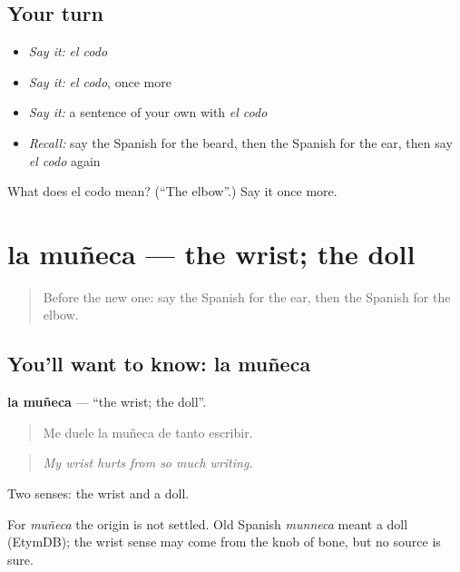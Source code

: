 \subsection*{Your turn}
\begin{itemize}
\raggedright
  \item \emph{Say it:} \emph{el codo}
  \item \emph{Say it:} \emph{el codo}, once more
  \item \emph{Say it:} a sentence of your own with \emph{el codo}
  \item \emph{Recall:} say the Spanish for the beard, then the Spanish for the ear, then say \emph{el codo} again
\end{itemize}

\begin{tcolorbox}[breakable,colback=teal!4,colframe=teal!35!black,title={Before you move on}]
What does el codo mean? (\textquotedblleft{}The elbow\textquotedblright{}.) Say it once more.
\end{tcolorbox}
\section[la muñeca]{la muñeca — the wrist; the doll}

\label{lesson:ES-C737-muneca}



\begin{quote}
Before the new one: say the Spanish for the ear, then the Spanish for the elbow.
\end{quote}

\subsection*{You'll want to know: la muñeca}
\textbf{la muñeca} — \textquotedblleft{}the wrist; the doll\textquotedblright{}.

\begin{quote}
Me duele la muñeca de tanto escribir.
\end{quote}

\begin{quote}
\emph{My wrist hurts from so much writing.}
\end{quote}

Two senses: the wrist and a doll.

\begin{cousinweb}
For \emph{muñeca} the origin is not settled. Old Spanish \emph{munneca} meant a doll (EtymDB); the wrist sense may come from the knob of bone, but no source is sure.
\end{cousinweb}

